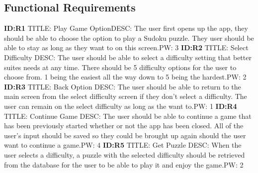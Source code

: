 \documentclass{article}
\begin{document}
\subsection{Functional Requirements}
\textbf{ID:R1} \newline TITLE: Play Game Option\newline DESC: The user first opens up the app, they should be able to choose the option to play a Sudoku puzzle. They user should be able to stay as long as they want to on this screen.\newline PW: 3 \newline \newline
\textbf{ID:R2} \newline TITLE: Select Difficulty \newline DESC: The user should be able to select a difficulty setting that better suites needs at any time. There should be 5 difficulty options for the user to choose from. 1 being the easiest all the way down to 5 being the hardest.\newline PW: 2 \newline \newline
\textbf{ID:R3} \newline TITLE: Back Option \newline DESC: The user should be able to return to the main screen from the select difficulty screen if they don't select a difficulty. The user can remain on the select difficulty as long as the want to.\newline PW: 1 \newline \newline
\textbf{ID:R4} \newline TITLE: Continue Game \newline DESC: The user should be able to continue a game that has been previously started whether or not the app has been closed. All of the user's input should be saved so they could be brought up again should the user want to continue a game.\newline PW: 4 \newline \newline
\textbf{ID:R5} \newline TITLE: Get Puzzle \newline DESC: When the user selects a difficulty, a puzzle with the selected difficulty should be retrieved from the database for the user to be able to play it and enjoy the game.\newline PW: 2 \newline \newline
\end{document}
